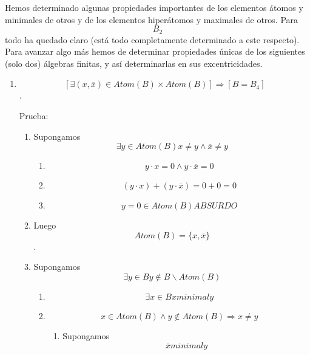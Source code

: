 \documentclass[
]{article}
\providecommand{\tightlist}{%
  \setlength{\itemsep}{0pt}\setlength{\parskip}{0pt}}
\begin{document}
\begin{enumerate}
\begin{enumerate}
    Hemos determinado algunas propiedades importantes de los elementos
    átomos y minimales de otros y de los elementos hiperátomos y
    maximales de otros. Para \[B_{2}\] todo ha quedado claro (está todo
    completamente determinado a este respecto). Para avanzar algo más
    hemos de determinar propiedades únicas de los siguientes (solo dos)
    álgebras finitas, y así determinarlas en sus excentricidades.

    \begin{enumerate}
    \def\labelenumiii{\arabic{enumiii}.}
    \setcounter{enumiii}{82}
    \item
      \[\left\lbrack {\exists{\left( {x,\overline{x}} \right) \in \mathit{Atom}}{{(B)} \times \mathit{Atom}}{(B)}} \right\rbrack\Rightarrow\left\lbrack {B = B_{4}} \right\rbrack\].

      Prueba:

      \begin{enumerate}
      \def\labelenumiv{\arabic{enumiv}.}
      \item
        Supongamos
        \[\exists{y \in \mathit{Atom}}{(B)}{{x \neq {y \land \overline{x}}} \neq y}\]

        \begin{enumerate}
        \def\labelenumv{\arabic{enumv}.}
        \tightlist
        \item
          \[{{y \cdot x} = {{0 \land y} \cdot \overline{x}}} = 0\]
        \item
          \[{{{({y \cdot x})} + {({y \cdot \overline{x}})}} = {0 + 0}} = 0\]
        \item
          \[{{y = 0} \in \mathit{Atom}}{(B)}\mathit{ABSURDO}\]
        \end{enumerate}
      \item
        Luego \[\mathit{Atom}{{(B)} = {\{{x,\overline{x}}\}}}\].
      \item
        Supongamos
        \[\exists{y \in B}{y \notin {B \smallsetminus {\mathit{Atom}{(B)}}}}\]

        \begin{enumerate}
        \def\labelenumv{\arabic{enumv}.}
        \item
          \[\exists{x \in B}x\mathsf{\mathit{minimal}}y\]
        \item
          \[{x \in \mathit{Atom}}{{{(B)} \land y} \notin \mathit{Atom}}{(B)}\Rightarrow{x \neq y}\]

          \begin{enumerate}
          \def\labelenumvi{\arabic{enumvi}.}
          \item
            Supongamos \[\overline{x}\mathsf{\mathit{minimal}}y\]


\end{enumerate}
\end{enumerate}
\end{enumerate}
\end{enumerate}
\end{enumerate}
\end{enumerate}
\end{document}
